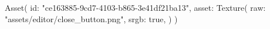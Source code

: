 Asset(
    id: "{ce163885-9cd7-4103-b865-3e41df21ba13}",
    asset: Texture(
        raw:  "assets/editor/close_button.png",
        srgb: true,
    )
)
